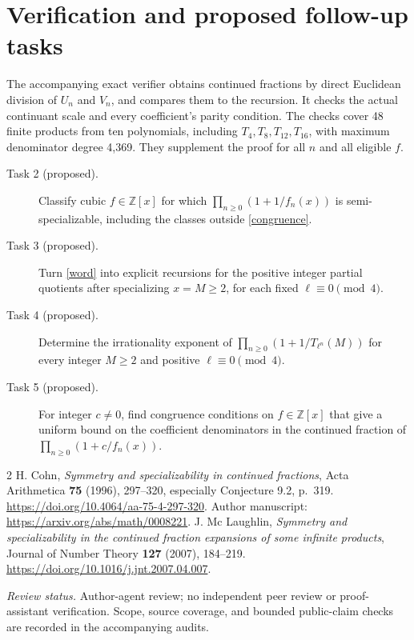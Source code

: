 \documentclass[11pt]{article}
\newcommand{\ZZ}{\mathbb Z}
\begin{document}
\section*{Verification and proposed follow-up tasks}
The accompanying exact verifier obtains continued fractions by direct
Euclidean division of $U_n$ and $V_n$, and compares them to the recursion.
It checks the actual continuant scale and every coefficient's parity
condition. The checks cover 48 finite products from ten polynomials,
including $T_4,T_8,T_{12},T_{16}$, with maximum denominator degree 4,369.
They supplement the proof for all $n$ and all eligible $f$.

\begin{description}
\item[Task 2 (proposed).] Classify cubic $f\in\ZZ[x]$ for which
$\prod_{n\geq0}(1+1/f_n(x))$ is semi-specializable, including the classes
outside \eqref{congruence}.
\item[Task 3 (proposed).] Turn \eqref{word} into explicit recursions for
the positive integer partial quotients after specializing $x=M\geq2$,
for each fixed $\ell\equiv0\pmod4$.
\item[Task 4 (proposed).] Determine the irrationality exponent of
$\prod_{n\geq0}(1+1/T_{\ell^n}(M))$ for every integer $M\geq2$ and
positive $\ell\equiv0\pmod4$.
\item[Task 5 (proposed).] For integer $c\ne0$, find congruence conditions
on $f\in\ZZ[x]$ that give a uniform bound on the coefficient denominators
in the continued fraction of $\prod_{n\geq0}(1+c/f_n(x))$.
\end{description}

\begin{thebibliography}{2}
 H. Cohn, \emph{Symmetry and specializability in continued
fractions}, Acta Arithmetica \textbf{75} (1996), 297--320,
especially Conjecture 9.2, p.~319.
\url{https://doi.org/10.4064/aa-75-4-297-320}.
Author manuscript: \url{https://arxiv.org/abs/math/0008221}.
 J. Mc Laughlin, \emph{Symmetry and specializability in the
continued fraction expansions of some infinite products}, Journal of
Number Theory \textbf{127} (2007), 184--219.
\url{https://doi.org/10.1016/j.jnt.2007.04.007}.
\end{thebibliography}
\noindent\textit{Review status.} Author-agent review; no independent peer
review or proof-assistant verification. Scope, source coverage, and bounded
public-claim checks are recorded in the accompanying audits.
\end{document}
